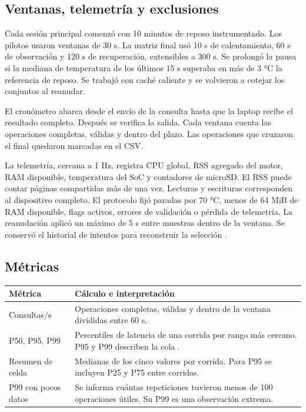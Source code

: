 \documentclass[10pt,a4paper]{article}
\begin{document}
\subsection{Ventanas, telemetría y exclusiones}
Cada sesión principal comenzó con 10 minutos de reposo instrumentado. Los pilotos usaron ventanas de 30 s. La matriz final usó 10 s de calentamiento, 60 s de observación y 120 s de recuperación, extensibles a 300 s. Se prolongó la pausa si la mediana de temperatura de los últimos 15 s superaba en más de 3 °C la referencia de reposo. Se trabajó con caché caliente y se volvieron a cotejar los conjuntos al reanudar.

El cronómetro abarca desde el envío de la consulta hasta que la laptop recibe el resultado completo. Después se verifica la salida. Cada ventana cuenta las operaciones completas, válidas y dentro del plazo. Las operaciones que cruzaron el final quedaron marcadas en el CSV.

La telemetría, cercana a 1 Hz, registra CPU global, RSS agregado del motor, RAM disponible, temperatura del SoC y contadores de microSD. El RSS puede contar páginas compartidas más de una vez. Lecturas y escrituras corresponden al dispositivo completo. El protocolo fijó paradas por 70 °C, menos de 64 MiB de RAM disponible, flags activos, errores de validación o pérdida de telemetría. La reanudación aplicó un máximo de 5 s entre muestras dentro de la ventana. Se conservó el historial de intentos para reconstruir la selección \cite{sandve}.

\subsection{Métricas}
\begin{tabularx}{\linewidth}{@{}lX@{}}
\toprule Métrica & Cálculo e interpretación\\
\midrule
Consultas/s & Operaciones completas, válidas y dentro de la ventana divididas entre 60 s.\\
P50, P95, P99 & Percentiles de latencia de una corrida por rango más cercano. P95 y P99 describen la cola \cite{tail}.\\
Resumen de celda & Medianas de los cinco valores por corrida. Para P95 se incluyen P25 y P75 entre corridas.\\
P99 con pocos datos & Se informa cuántas repeticiones tuvieron menos de 100 operaciones útiles. Su P99 es una observación extrema.\\
\bottomrule
\end{tabularx}
\end{document}
